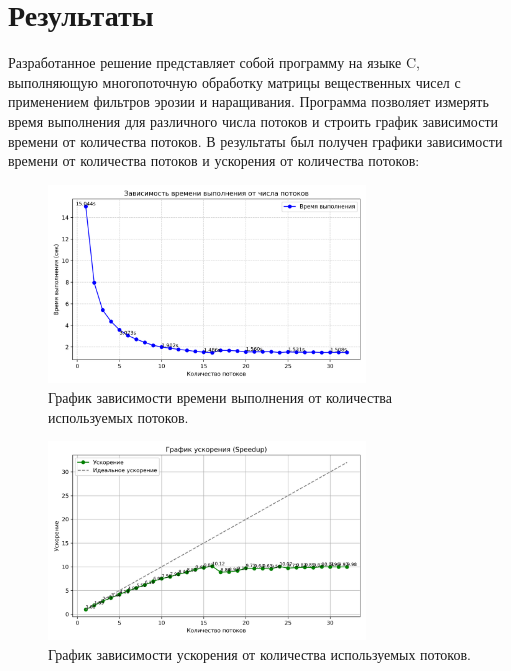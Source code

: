\section{Результаты}

Разработанное решение представляет собой программу на языке C, выполняющую многопоточную обработку матрицы вещественных чисел с применением фильтров эрозии и наращивания. Программа позволяет измерять время выполнения для различного числа потоков и строить график зависимости времени от количества потоков.
В результаты был получен графики зависимости времени от количества потоков и ускорения от количества потоков:

\begin{figure}[h]
    \centering
    \includegraphics[width=0.75\textwidth]{src/results.png}
    \caption{График зависимости времени выполнения от количества используемых потоков.}
    \label{fig:graph}
\end{figure}

\begin{figure}[h]
    \centering
    \includegraphics[width=0.75\textwidth]{src/results_speedup.png}
    \caption{График зависимости ускорения от количества используемых потоков.}
    \label{fig:graph}
\end{figure}

